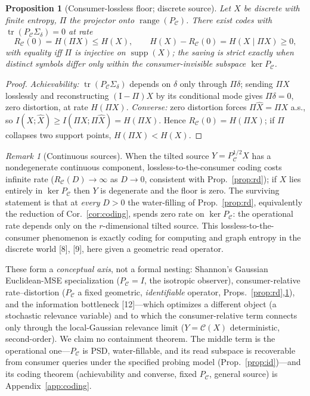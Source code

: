 \documentclass[lettersize,onecolumn]{IEEEtran}
\newtheorem{proposition}{Proposition}
\theoremstyle{definition}
\theoremstyle{remark}
\newtheorem*{remark}{Remark}
\newcommand{\PC}{P_{\mathcal{C}}}
\newcommand{\Sd}{\Sigma_{\delta}}
\newcommand{\tr}{\operatorname{tr}}
\begin{document}
\begin{proposition}[Consumer-lossless floor; discrete source]\label{prop:floor}
Let $X$ be discrete with finite entropy, $\Pi$ the projector onto
$\operatorname{range}(\PC)$. There exist codes with $\tr(\PC\Sd)=0$ at rate
\[
R_{\mathcal{C}}(0)=H(\Pi X)\le H(X),\qquad H(X)-R_{\mathcal{C}}(0)=H(X\mid\Pi X)\ge0,
\]
with equality iff $\Pi$ is injective on $\operatorname{supp}(X)$; the saving is
strict exactly when distinct symbols differ only within the consumer-invisible
subspace $\ker\PC$.
\end{proposition}
\begin{proof}
\emph{Achievability:} $\tr(\PC\Sd)$ depends on $\delta$ only through $\Pi\delta$;
sending $\Pi X$ losslessly and reconstructing $(\mathrm I-\Pi)X$ by its conditional
mode gives $\Pi\delta=0$, zero distortion, at rate $H(\Pi X)$. \emph{Converse:} zero
distortion forces $\Pi\hat X=\Pi X$ a.s., so $I(X;\hat X)\ge I(\Pi X;\Pi\hat X)=
H(\Pi X)$. Hence $R_{\mathcal{C}}(0)=H(\Pi X)$; if $\Pi$ collapses two support points,
$H(\Pi X)<H(X)$.
\end{proof}
\begin{remark}[Continuous sources]
When the tilted source $Y=\PC^{1/2}X$ has a nondegenerate continuous component,
lossless-to-the-consumer coding costs infinite rate ($R_{\mathcal{C}}(D)\to\infty$ as
$D\to0$, consistent with Prop.~\ref{prop:rd}); if $X$ lies entirely in $\ker\PC$ then
$Y$ is degenerate and the floor is zero. The surviving statement is
that at \emph{every} $D>0$ the water-filling of Prop.~\ref{prop:rd}, equivalently the
reduction of Cor.~\ref{cor:coding}, spends zero rate on $\ker\PC$: the operational
rate depends only on the $r$-dimensional tilted source. This lossless-to-the-consumer
phenomenon is exactly coding for computing and graph entropy in the discrete world
[8], [9], here given a geometric read operator.
\end{remark}

These form a \emph{conceptual axis}, not a formal nesting: Shannon's Gaussian
Euclidean-MSE specialization ($\PC=I$, the isotropic observer), consumer-relative
rate--distortion ($\PC$ a fixed
geometric, \emph{identifiable} operator, Props.~\ref{prop:rd},\ref{prop:floor}), and
the information bottleneck [12]---which optimizes a different object (a
stochastic relevance variable) and to which the consumer-relative term connects only
through the local-Gaussian relevance limit ($Y=\mathcal{C}(X)$ deterministic,
second-order). We claim no containment theorem. The middle term is the operational
one---$\PC$ is PSD, water-fillable, and its read subspace is recoverable from consumer
queries under the specified probing model (Prop.~\ref{prop:id})---and its coding
theorem (achievability and converse, fixed
$\PC$, general source) is Appendix~\ref{app:coding}.
\end{document}
